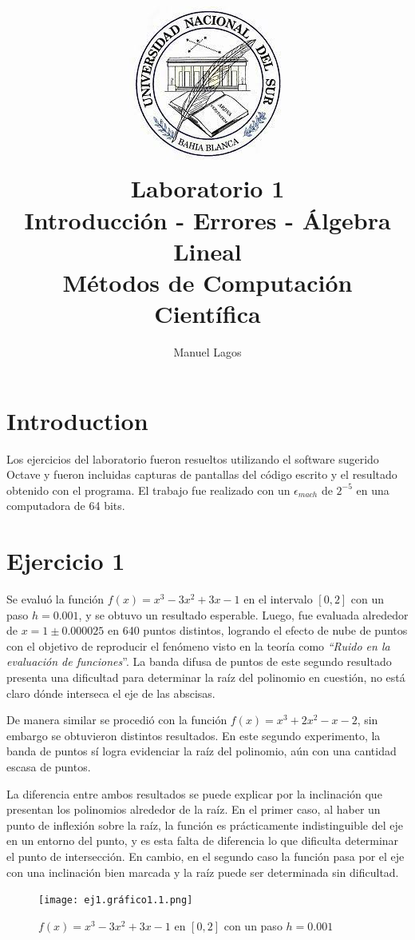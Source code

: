 \documentclass{article}
\title{\includegraphics[scale=0.5]{logo.jpg}\\ \textbf{Laboratorio 1} 
\\ \large Introducción - Errores - Álgebra Lineal                   
\\ \large Métodos de Computación Científica}
\author{Manuel Lagos}
\begin{document}
\maketitle

\section{Introduction}

Los ejercicios del laboratorio fueron resueltos utilizando el software sugerido Octave y fueron incluidas capturas de pantallas del código escrito y el resultado obtenido con el programa. El trabajo fue realizado con un $\epsilon_{mach}$ de $2^{-5}$ en una computadora de 64 bits.

\section{Ejercicio 1}
Se evaluó la función $f(x)=x^3-3x^2+3x-1$ en el intervalo $[0, 2]$ con un paso $h=0.001$, y se obtuvo un resultado esperable. Luego, fue evaluada alrededor de $x=1\pm0.000025$ en 640 puntos distintos, logrando el efecto de nube de puntos con el objetivo de reproducir el fenómeno visto en la teoría como \textit{“Ruido en la evaluación de funciones}”. La banda difusa de puntos de este segundo resultado presenta una dificultad para determinar la raíz del polinomio en cuestión, no está claro dónde interseca el eje de las abscisas. 

De manera similar se procedió con la función $f(x)=x^3+2x^2-x-2$, sin embargo se obtuvieron distintos resultados. En este segundo experimento, la banda de puntos sí logra evidenciar la raíz del polinomio, aún con una cantidad escasa de puntos.

La diferencia entre ambos resultados se puede explicar por la inclinación que presentan los polinomios alrededor de la raíz. En el primer caso, al haber un punto de inflexión sobre la raíz, la función es prácticamente indistinguible del eje en un entorno del punto, y es esta falta de diferencia lo que dificulta determinar el punto de intersección. En cambio, en el segundo caso la función pasa por el eje con una inclinación bien marcada y la raíz puede ser determinada sin dificultad. 

\begin{figure}[H]
    \centering
    \texttt{[image: ej1.gráfico1.1.png]}
    \caption{$f(x)=x^3-3x^2+3x-1$ en $[0, 2]$ con un paso $h=0.001$}
    \label{fig:enter-label}
\end{figure}
\end{document}
